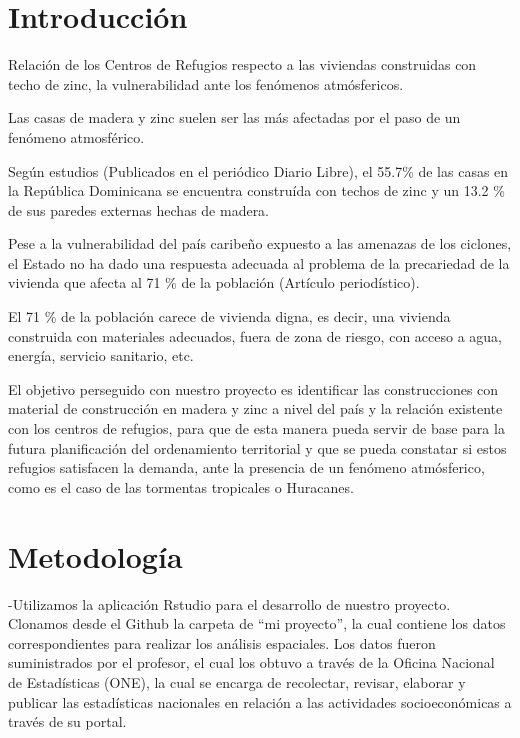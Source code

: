 \documentclass[11pt,]{article}
\begin{document}
\vskip 6.5pt


\noindent  \section{Introducción}\label{introducciuxf3n}

Relación de los Centros de Refugios respecto a las viviendas construidas
con techo de zinc, la vulnerabilidad ante los fenómenos atmósfericos.

Las casas de madera y zinc suelen ser las más afectadas por el paso de
un fenómeno atmosférico.

Según estudios (Publicados en el periódico Diario Libre), el 55.7\% de
las casas en la República Dominicana se encuentra construída con techos
de zinc y un 13.2 \% de sus paredes externas hechas de madera.

Pese a la vulnerabilidad del país caribeño expuesto a las amenazas de
los ciclones, el Estado no ha dado una respuesta adecuada al problema de
la precariedad de la vivienda que afecta al 71 \% de la población
(Artículo periodístico).

El 71 \% de la población carece de vivienda digna, es decir, una
vivienda construida con materiales adecuados, fuera de zona de riesgo,
con acceso a agua, energía, servicio sanitario, etc.

El objetivo perseguido con nuestro proyecto es identificar las
construcciones con material de construcción en madera y zinc a nivel del
país y la relación existente con los centros de refugios, para que de
esta manera pueda servir de base para la futura planificación del
ordenamiento territorial y que se pueda constatar si estos refugios
satisfacen la demanda, ante la presencia de un fenómeno atmósferico,
como es el caso de las tormentas tropicales o Huracanes.

\section{Metodología}\label{metodologuxeda}

-Utilizamos la aplicación Rstudio para el desarrollo de nuestro
proyecto. Clonamos desde el Github la carpeta de ``mi proyecto'', la
cual contiene los datos correspondientes para realizar los análisis
espaciales. Los datos fueron suministrados por el profesor, el cual los
obtuvo a través de la Oficina Nacional de Estadísticas (ONE), la cual se
encarga de recolectar, revisar, elaborar y publicar las estadísticas
nacionales en relación a las actividades socioeconómicas a través de su
portal.
\end{document}
